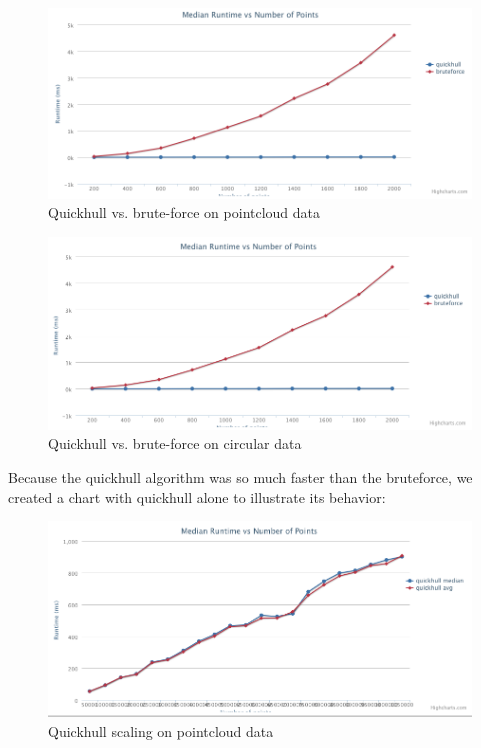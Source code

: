 \documentclass[11pt]{article}
\begin{document}
\begin{figure}
	\caption{Quickhull vs. brute-force on pointcloud data}
	\centering
	\includegraphics[scale=0.3]{qh-v-bf-cloud.png} 
\end{figure}

\begin{figure}
	\caption{Quickhull vs. brute-force on circular data}
	\centering
	\includegraphics[scale=0.3]{qh-v-bf-circle.png} 
\end{figure}

Because the quickhull algorithm was so much faster than the bruteforce, we created a chart with quickhull alone to illustrate its behavior:

\begin{figure}
	\caption{Quickhull scaling on pointcloud data}
	\centering
	\includegraphics[scale=0.3]{qh-only.png} 
\end{figure}
\end{document}
